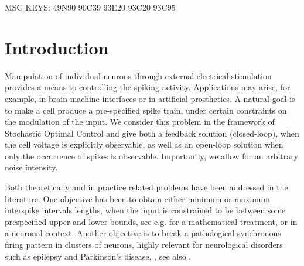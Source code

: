 \documentclass{article}
\begin{document}
\tableofcontents


MSC KEYS: 49N90 90C39 93E20 93C20 93C95

\section{Introduction}
Manipulation of individual neurons through external electrical
stimulation provides a means to
controlling the spiking activity. Applications may arise, for
example, in brain-machine interfaces or in artificial prosthetics.
A natural goal is to make a cell produce a pre-specified spike train,
under certain constraints on the modulation of the input.
We consider this problem in the framework of Stochastic Optimal Control and
give both a feedback solution (closed-loop), when the cell voltage is
explicitly observable, as well as an open-loop solution when only the
occurrence of spikes is observable. Importantly, we allow for an
arbitrary noise intensity.

Both theoretically and in practice related problems have been
addressed in the literature. One objective has been to
obtain either minimum or maximum interspike intervals lengths,
when the input is constrained to be between some prespecified upper
and lower bounds, see e.g. \cite{Lee1994,Lefebvre1987} for a
mathematical treatment, or \cite{Danzl2009,Nabi2012,Wu2009} in a neuronal
context. Another objective is to break a pathological synchronous
firing pattern in clusters of neurons, highly relevant for neurological
disorders such as epilepsy and Parkinson's disease,
\cite{Nabi2013a,Nabi2011}, see also \cite{Feng2007b}.
\end{document}
